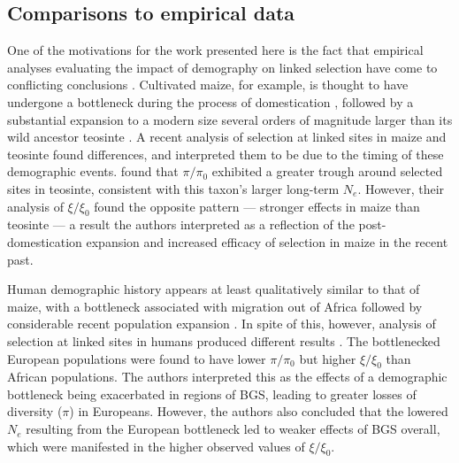 \documentclass[9pt,twocolumn,twoside]{rilabRxiv}
\begin{document}
\subsection{Comparisons to empirical data}

One of the motivations for the work presented here is the fact that empirical analyses evaluating the impact of demography on linked selection have come to conflicting conclusions \citep{torres2018human, beissinger2016recent}.
Cultivated maize, for example, is thought to have undergone a bottleneck during the process of domestication \citep{eyre1998investigation,tenaillon2004selection,wright2005effects}, followed by a substantial expansion to a modern size several orders of magnitude larger than its wild ancestor teosinte \citep{beissinger2016recent, bellon2018evolutionary}.
A recent analysis of selection at linked sites in  maize and teosinte found differences, and interpreted them to be due to the timing of these demographic events.
\citet{beissinger2016recent} found that $\pi/\pi_0$ exhibited a greater trough around selected sites in teosinte, consistent with this taxon's larger long-term $N_e$.
However, their analysis of $\xi/\xi_0$ found the opposite pattern --- stronger effects in maize than teosinte --- a result the authors interpreted as a reflection of the post-domestication expansion and increased efficacy of selection in maize in the recent past.

Human demographic history appears at least qualitatively similar to that of maize, with a bottleneck associated with migration out of Africa followed by considerable recent population expansion \citep{tennessen2012evolution}.
In spite of this, however, analysis of selection at linked sites in humans produced different results \citep{torres2018human}.
The bottlenecked European populations were found to have lower $\pi/\pi_0$ but higher $\xi/\xi_0$ than African populations. The authors interpreted this as the effects of a demographic bottleneck being exacerbated in regions of BGS, leading to greater losses of diversity ($\pi$) in Europeans. However, the authors also concluded that the lowered $N_e$ resulting from the European bottleneck led to weaker effects of BGS overall, which were manifested in the higher observed values of $\xi/\xi_0$.
\end{document}
